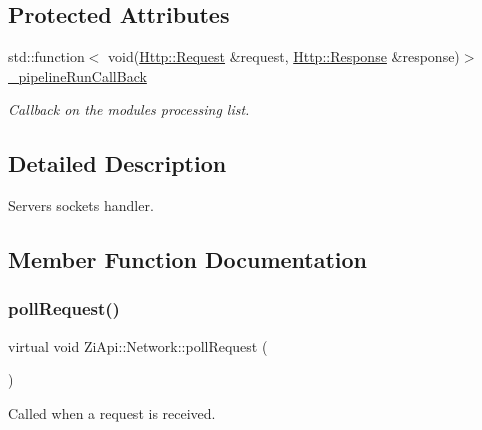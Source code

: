 \subsection*{Protected Attributes}
\begin{DoxyCompactItemize}
\item 
\mbox{\label{classZiApi_1_1Network_a9849d858fc05af620e717f643f4071f6}} 
std\+::function$<$ void(\mbox{\hyperlink{classHttp_1_1Request}{Http\+::\+Request}} \&request, \mbox{\hyperlink{classHttp_1_1Response}{Http\+::\+Response}} \&response)$>$ \mbox{\hyperlink{classZiApi_1_1Network_a9849d858fc05af620e717f643f4071f6}{\+\_\+pipeline\+Run\+Call\+Back}}
\begin{DoxyCompactList}\small\item\em Callback on the module\textquotesingle{}s processing list. \end{DoxyCompactList}\end{DoxyCompactItemize}


\subsection{Detailed Description}
Server\textquotesingle{}s sockets handler. 

\subsection{Member Function Documentation}
\mbox{\label{classZiApi_1_1Network_a965edba3c55b9c268af44af7f204be66}} 
\subsubsection{\texorpdfstring{pollRequest()}{pollRequest()}}
{\footnotesize\ttfamily virtual void Zi\+Api\+::\+Network\+::poll\+Request (\begin{DoxyParamCaption}{ }\end{DoxyParamCaption})\hspace{0.3cm}{\ttfamily [pure virtual]}}



Called when a request is received. 

